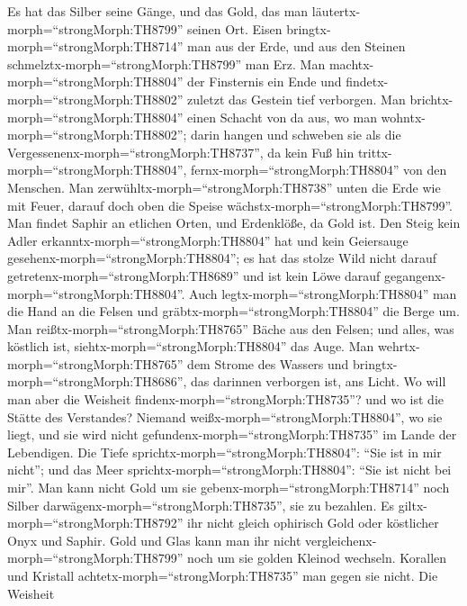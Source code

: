 Es hat das Silber seine Gänge, und das Gold, das man
läutertx-morph=``strongMorph:TH8799'' seinen Ort.  Eisen
bringtx-morph=``strongMorph:TH8714'' man aus der Erde, und aus den
Steinen schmelztx-morph=``strongMorph:TH8799'' man Erz.  Man
machtx-morph=``strongMorph:TH8804'' der Finsternis ein Ende und
findetx-morph=``strongMorph:TH8802'' zuletzt das Gestein tief verborgen.
 Man brichtx-morph=``strongMorph:TH8804'' einen Schacht von
da aus, wo man wohntx-morph=``strongMorph:TH8802''; darin hangen und
schweben sie als die Vergessenenx-morph=``strongMorph:TH8737'', da kein
Fuß hin trittx-morph=``strongMorph:TH8804'',
fernx-morph=``strongMorph:TH8804'' von den Menschen.  Man
zerwühltx-morph=``strongMorph:TH8738'' unten die Erde wie mit Feuer,
darauf doch oben die Speise wächstx-morph=``strongMorph:TH8799''.
 Man findet Saphir an etlichen Orten, und Erdenklöße, da
Gold ist.  Den Steig kein Adler
erkanntx-morph=``strongMorph:TH8804'' hat und kein Geiersauge
gesehenx-morph=``strongMorph:TH8804'';  es hat das stolze
Wild nicht darauf getretenx-morph=``strongMorph:TH8689'' und ist kein
Löwe darauf gegangenx-morph=``strongMorph:TH8804''.  Auch
legtx-morph=``strongMorph:TH8804'' man die Hand an die Felsen und
gräbtx-morph=``strongMorph:TH8804'' die Berge um.  Man
reißtx-morph=``strongMorph:TH8765'' Bäche aus den Felsen; und alles, was
köstlich ist, siehtx-morph=``strongMorph:TH8804'' das Auge.
 Man wehrtx-morph=``strongMorph:TH8765'' dem Strome des
Wassers und bringtx-morph=``strongMorph:TH8686'', das darinnen verborgen
ist, ans Licht.  Wo will man aber die Weisheit
findenx-morph=``strongMorph:TH8735''? und wo ist die Stätte des
Verstandes?  Niemand weißx-morph=``strongMorph:TH8804'', wo
sie liegt, und sie wird nicht gefundenx-morph=``strongMorph:TH8735'' im
Lande der Lebendigen.  Die Tiefe
sprichtx-morph=``strongMorph:TH8804'': ``Sie ist in mir nicht''; und das
Meer sprichtx-morph=``strongMorph:TH8804'': ``Sie ist nicht bei mir''.
 Man kann nicht Gold um sie
gebenx-morph=``strongMorph:TH8714'' noch Silber
darwägenx-morph=``strongMorph:TH8735'', sie zu bezahlen. 
Es giltx-morph=``strongMorph:TH8792'' ihr nicht gleich ophirisch Gold
oder köstlicher Onyx und Saphir.  Gold und Glas kann man
ihr nicht vergleichenx-morph=``strongMorph:TH8799'' noch um sie golden
Kleinod wechseln.  Korallen und Kristall
achtetx-morph=``strongMorph:TH8735'' man gegen sie nicht. Die Weisheit
